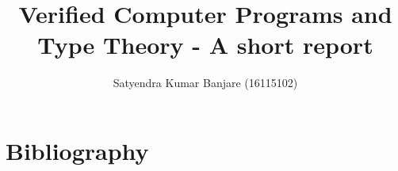 \documentclass[11pt,twoside,openany]{report}
\title{Verified Computer Programs and Type Theory - A short report}
\author{Satyendra Kumar Banjare (16115102)}
\begin{document}
\maketitle




\tableofcontents









% 








\chapter{Bibliography}
\lipsum[1]
\lipsum[0]
\end{document}
